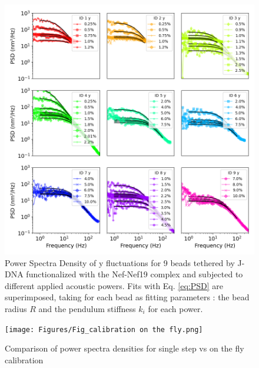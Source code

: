 \documentclass{biophys-new}
\begin{document}
\begin{figure}[hbt!]
	\centering
	\centerline {\includegraphics[width=0.75\linewidth]{Figures/multispectrumy_Nef.png}}
	\caption{%
	Power Spectra Density of y fluctuations for 9 beads tethered by J-DNA functionalized with the Nef-Nef19 complex and subjected to different applied acoustic powers. Fits with Eq. \ref{eq:PSD} are superimposed, taking for each bead as fitting parameters : the bead radius $R$ and the pendulum stiffness $k_i$ for each power.}
	\label{fig:FitSpectraNef}	
\end{figure}

\begin{figure}[hbt!]
	\centering
	\centerline {\texttt{[image: Figures/Fig\_calibration on the fly.png]}}
	\caption{Comparison of power spectra densities for single step vs on the fly calibration}
	\label{fig:Onthefly}	
\end{figure}
\end{document}
